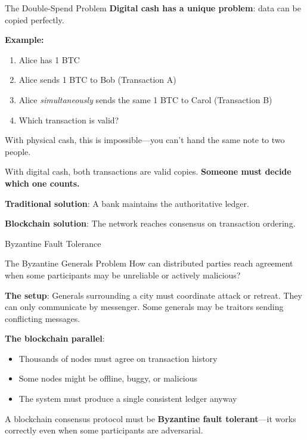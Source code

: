 \documentclass[10pt]{beamer}
\newcommand{\highlight}[1]{\textcolor{AccentOrange}{\textbf{#1}}}
\begin{document}
\begin{frame}{The Double-Spend Problem}
  \textbf{Digital cash has a unique problem}: data can be copied perfectly.
  
  \vspace{1em}
  \textbf{Example:}
  \begin{enumerate}
    \item Alice has 1 BTC
    \item Alice sends 1 BTC to Bob (Transaction A)
    \item Alice \textit{simultaneously} sends the same 1 BTC to Carol (Transaction B)
    \item Which transaction is valid?
  \end{enumerate}
  
  \vspace{1em}
  With physical cash, this is impossible---you can't hand the same note to two people.
  
  \vspace{0.5em}
  With digital cash, both transactions are valid copies. \highlight{Someone must decide which one counts.}
  
  \vspace{1em}
  \textbf{Traditional solution}: A bank maintains the authoritative ledger.
  
  \textbf{Blockchain solution}: The network reaches consensus on transaction ordering.
\end{frame}

\begin{frame}{Byzantine Fault Tolerance}
  \begin{block}{The Byzantine Generals Problem}
    How can distributed parties reach agreement when some participants may be unreliable or actively malicious?
  \end{block}
  
  \vspace{0.5em}
  \textbf{The setup}: Generals surrounding a city must coordinate attack or retreat. They can only communicate by messenger. Some generals may be traitors sending conflicting messages.
  
  \vspace{1em}
  \textbf{The blockchain parallel}:
  \begin{itemize}
    \item Thousands of nodes must agree on transaction history
    \item Some nodes might be offline, buggy, or malicious
    \item The system must produce a single consistent ledger anyway
  \end{itemize}
  
  \vspace{1em}
  A blockchain consensus protocol must be \highlight{Byzantine fault tolerant}---it works correctly even when some participants are adversarial.
\end{frame}
\end{document}
